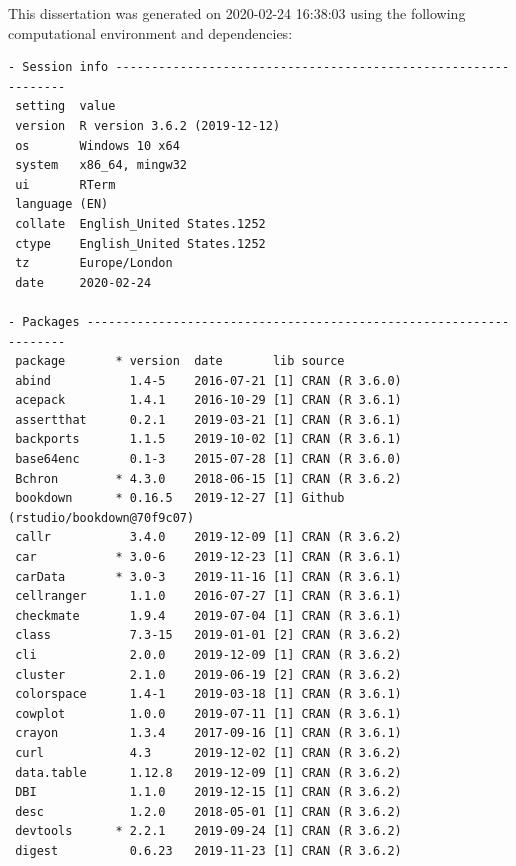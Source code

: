 \documentclass[12pt,twoside]{reedthesis}
\begin{document}
This dissertation was generated on 2020-02-24 16:38:03 using the following computational environment and dependencies:
\begin{verbatim}
- Session info ---------------------------------------------------------------
 setting  value                       
 version  R version 3.6.2 (2019-12-12)
 os       Windows 10 x64              
 system   x86_64, mingw32             
 ui       RTerm                       
 language (EN)                        
 collate  English_United States.1252  
 ctype    English_United States.1252  
 tz       Europe/London               
 date     2020-02-24                  

- Packages -------------------------------------------------------------------
 package       * version  date       lib source                            
 abind           1.4-5    2016-07-21 [1] CRAN (R 3.6.0)                    
 acepack         1.4.1    2016-10-29 [1] CRAN (R 3.6.1)                    
 assertthat      0.2.1    2019-03-21 [1] CRAN (R 3.6.1)                    
 backports       1.1.5    2019-10-02 [1] CRAN (R 3.6.1)                    
 base64enc       0.1-3    2015-07-28 [1] CRAN (R 3.6.0)                    
 Bchron        * 4.3.0    2018-06-15 [1] CRAN (R 3.6.2)                    
 bookdown      * 0.16.5   2019-12-27 [1] Github (rstudio/bookdown@70f9c07) 
 callr           3.4.0    2019-12-09 [1] CRAN (R 3.6.2)                    
 car           * 3.0-6    2019-12-23 [1] CRAN (R 3.6.1)                    
 carData       * 3.0-3    2019-11-16 [1] CRAN (R 3.6.1)                    
 cellranger      1.1.0    2016-07-27 [1] CRAN (R 3.6.1)                    
 checkmate       1.9.4    2019-07-04 [1] CRAN (R 3.6.1)                    
 class           7.3-15   2019-01-01 [2] CRAN (R 3.6.2)                    
 cli             2.0.0    2019-12-09 [1] CRAN (R 3.6.2)                    
 cluster         2.1.0    2019-06-19 [2] CRAN (R 3.6.2)                    
 colorspace      1.4-1    2019-03-18 [1] CRAN (R 3.6.1)                    
 cowplot         1.0.0    2019-07-11 [1] CRAN (R 3.6.1)                    
 crayon          1.3.4    2017-09-16 [1] CRAN (R 3.6.1)                    
 curl            4.3      2019-12-02 [1] CRAN (R 3.6.2)                    
 data.table      1.12.8   2019-12-09 [1] CRAN (R 3.6.2)                    
 DBI             1.1.0    2019-12-15 [1] CRAN (R 3.6.2)                    
 desc            1.2.0    2018-05-01 [1] CRAN (R 3.6.2)                    
 devtools      * 2.2.1    2019-09-24 [1] CRAN (R 3.6.2)                    
 digest          0.6.23   2019-11-23 [1] CRAN (R 3.6.2)                    

\end{verbatim}
\end{document}
